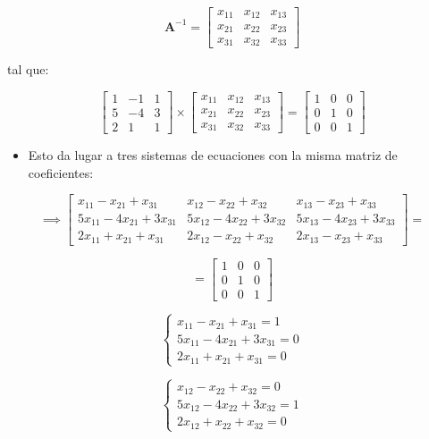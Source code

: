 \documentclass[openany]{book}
\providecommand{\tightlist}{%
  \setlength{\itemsep}{0pt}\setlength{\parskip}{0pt}}
\begin{document}
\[
\mathbf{A}^{-1} =
\begin{bmatrix}
x_{11} & x_{12} & x_{13} \\
x_{21} & x_{22} & x_{23} \\
x_{31} & x_{32} & x_{33} 
\end{bmatrix}
\]

tal que:

\[
\begin{bmatrix}
1 & -1 & 1 \\
5 & -4 & 3 \\
2 & 1 & 1 
\end{bmatrix}
\times
\begin{bmatrix}
x_{11} & x_{12} & x_{13} \\
x_{21} & x_{22} & x_{23} \\
x_{31} & x_{32} & x_{33} 
\end{bmatrix}
=
\begin{bmatrix}
1 & 0 & 0 \\
0 & 1 & 0 \\
0 & 0 & 1 
\end{bmatrix}
\]

\begin{itemize}
\tightlist
\item
  Esto da lugar a tres sistemas de ecuaciones con la misma matriz de coeficientes:
\end{itemize}

\[
\implies
\begin{bmatrix}
x_{11}-x_{21}+x_{31} & x_{12}-x_{22}+x_{32} & x_{13}-x_{23}+x_{33} \\
5x_{11}-4x_{21}+3x_{31} & 5x_{12}-4x_{22}+3x_{32} & 5x_{13}-4x_{23}+3x_{33} \\
2x_{11}+x_{21}+x_{31} & 2x_{12}-x_{22}+x_{32} & 2x_{13}-x_{23}+x_{33} 
\end{bmatrix}
=
\]

\[
=
\begin{bmatrix}
1 & 0 & 0 \\
0 & 1 & 0 \\
0 & 0 & 1 
\end{bmatrix}
\]

\[
\begin{cases} 
x_{11}-x_{21}+x_{31}=1 \\
5x_{11}-4x_{21}+3x_{31}=0 \\
2x_{11}+x_{21}+x_{31}=0
\end{cases}
\]

\[
\begin{cases} 
x_{12}-x_{22}+x_{32}=0 \\
5x_{12}-4x_{22}+3x_{32}=1 \\
2x_{12}+x_{22}+x_{32}=0
\end{cases}
\]
\end{document}
